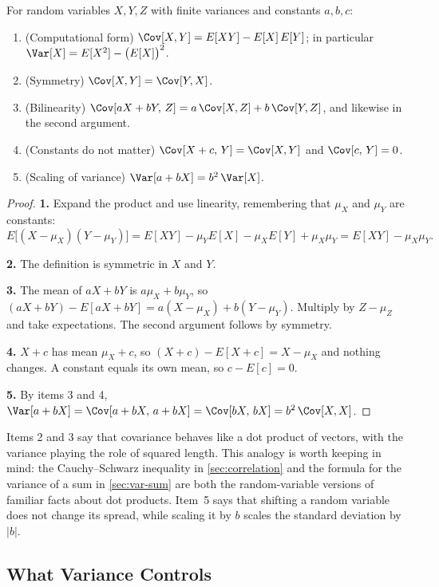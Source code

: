 \begin{proposition}\label{prop:cov-properties}
	For random variables $X,Y,Z$ with finite variances and constants $a,b,c$:
	\begin{enumerate}[nosep]
		\item (Computational form) $\Cov[X,Y]=E[XY]-E[X]\,E[Y]$; in particular $\Var[X]=E[X^{2}]-\bigl(E[X]\bigr)^{2}$.
		\item (Symmetry) $\Cov[X,Y]=\Cov[Y,X]$.
		\item (Bilinearity) $\Cov[aX+bY,\,Z]=a\,\Cov[X,Z]+b\,\Cov[Y,Z]$, and likewise in the second argument.
		\item (Constants do not matter) $\Cov[X+c,\,Y]=\Cov[X,Y]$ and $\Cov[c,\,Y]=0$.
		\item (Scaling of variance) $\Var[a+bX]=b^{2}\,\Var[X]$.
	\end{enumerate}
\end{proposition}

\begin{proof}
	\textbf{1.} Expand the product and use linearity, remembering that $\mu_{X}$ and $\mu_{Y}$ are constants:
	\[
		E\bigl[(X-\mu_{X})(Y-\mu_{Y})\bigr]
		= E[XY]-\mu_{Y}E[X]-\mu_{X}E[Y]+\mu_{X}\mu_{Y}
		= E[XY]-\mu_{X}\mu_{Y} .
	\]

	\textbf{2.} The definition is symmetric in $X$ and $Y$.

	\textbf{3.} The mean of $aX+bY$ is $a\mu_{X}+b\mu_{Y}$, so $(aX+bY)-E[aX+bY]=a(X-\mu_{X})+b(Y-\mu_{Y})$.
	Multiply by $Z-\mu_{Z}$ and take expectations.
	The second argument follows by symmetry.

	\textbf{4.} $X+c$ has mean $\mu_{X}+c$, so $(X+c)-E[X+c]=X-\mu_{X}$ and nothing changes.
	A constant equals its own mean, so $c-E[c]=0$.

	\textbf{5.} By items 3 and 4, $\Var[a+bX]=\Cov[a+bX,\,a+bX]=\Cov[bX,\,bX]=b^{2}\,\Cov[X,X]$.
\end{proof}

Items 2 and 3 say that covariance behaves like a dot product of vectors, with the variance playing the role of squared length.
This analogy is worth keeping in mind: the Cauchy--Schwarz inequality in \autoref{sec:correlation} and the formula for the variance of a sum in \autoref{sec:var-sum} are both the random-variable versions of familiar facts about dot products.
Item~5 says that shifting a random variable does not change its spread, while scaling it by $b$ scales the standard deviation by $|b|$.

\subsection{What Variance Controls}

